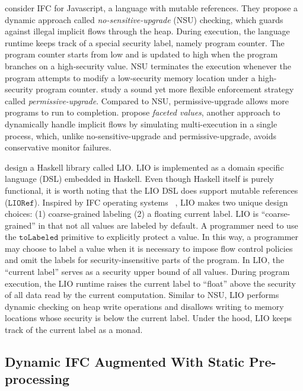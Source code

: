 \documentclass[10pt, letterpaper]{article}
\newcommand{\key}[1]{\ensuremath{\mathtt{#1}}}
\begin{document}
\citet{austin2009efficient} consider IFC for Javascript, a language with
mutable references. They propose a dynamic approach called
\textit{no-sensitive-upgrade} (NSU) checking, which guards against illegal
implicit flows through the heap. During execution, the language runtime keeps
track of a special security label, namely program counter. The program counter
starts from low and is updated to high when the program branches on a
high-security value. NSU terminates the execution whenever the program attempts
to modify a low-security memory location under a high-security program counter.
\citet{austin2010permissive} study a sound yet more flexible enforcement
strategy called \textit{permissive-upgrade}. Compared to NSU, permissive-upgrade
allows more programs to run to completion.
\citet{austin2012multiple,Austin:2017uh} propose \textit{faceted values},
another approach to dynamically handle implicit flows by simulating
multi-execution in a single process, which, unlike no-sensitive-upgrade and
permissive-upgrade, avoids conservative monitor failures.

\citet{stefan2011flexible,stefan2012flexible,STEFAN:2017ta} design a Haskell
library called LIO. LIO is implemented as a domain specific language (DSL)
embedded in Haskell. Even though Haskell itself is purely functional, it is
worth noting that the LIO DSL does support mutable references (\key{LIORef}).
Inspired by IFC operating systems
~\citep{efstathopoulos2005labels,zeldovich2011making,krohn2007information,vandebogart2007labels},
LIO makes two unique design choices: (1) coarse-grained labeling (2) a floating
current label. LIO is ``coarse-grained'' in that not all values are labeled by
default. A programmer need to use the \key{toLabeled} primitive to explicitly
protect a value. In this way, a programmer may choose to label a value when it
is necessary to impose flow control policies and omit the labels for
security-insensitive parts of the program. In LIO, the ``current label'' serves
as a security upper bound of all values. During program execution, the LIO
runtime raises the current label to ``float'' above the security of all data
read by the current computation. Similar to NSU, LIO performs dynamic checking
on heap write operations and disallows writing to memory locations whose
security is below the current label. Under the hood, LIO keeps track of the
current label as a monad.

\subsection{Dynamic IFC Augmented With Static Pre-processing}
\label{sec:intro-dyn-static}
\end{document}
